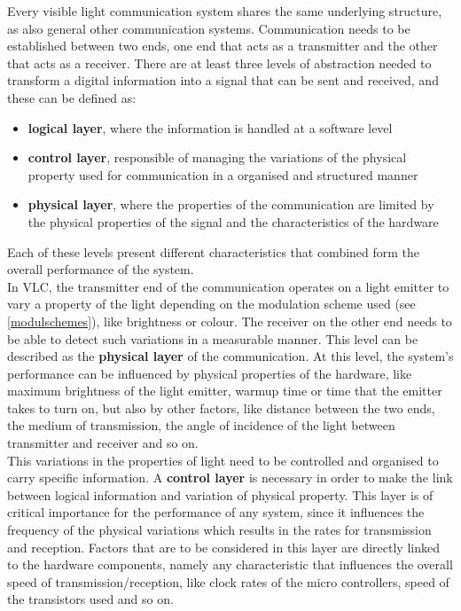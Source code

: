 Every visible light communication system shares the same underlying structure, as also general other communication systems.
Communication needs to be established between two ends, one end that acts as a transmitter and the other that acts as a receiver.
There are at least three levels of abstraction needed to transform a digital information into a signal that can be sent and received, and these can be defined as: 
\begin{itemize}
\item \textbf{logical layer}, where the information is handled at a software level
\item \textbf{control layer}, responsible of managing the variations of the physical property used for communication in a organised and structured manner
\item \textbf{physical layer}, where the properties of the communication are limited by the physical properties of the signal and the characteristics of the hardware
\end{itemize}
Each of these levels present different characteristics that combined form the overall performance of the system.\\

In VLC, the transmitter end of the communication operates on a light emitter to vary a property of the light depending on the modulation scheme used (see \ref{modulschemes}), like brightness or colour.
The receiver on the other end needs to be able to detect such variations in a measurable manner.
This level can be described as the \textbf{physical layer} of the communication.
At this level, the system's performance can be influenced by physical properties of the hardware, like maximum brightness of the light emitter, warmup time or time that the emitter takes to turn on, but also by other factors, like distance between the two ends, the medium of transmission, the angle of incidence of the light between transmitter and receiver and so on.\\

This variations in the properties of light need to be controlled and organised to carry specific information.
A \textbf{control layer} is necessary in order to make the link between logical information and variation of physical property.
This layer is of critical importance for the performance of any system, since it influences the frequency of the physical variations which results in the rates for transmission and reception.
Factors that are to be considered in this layer are directly linked to the hardware components, namely any characteristic that influences the overall speed of transmission/reception, like clock rates of the micro controllers, speed of the transistors used and so on.\\


